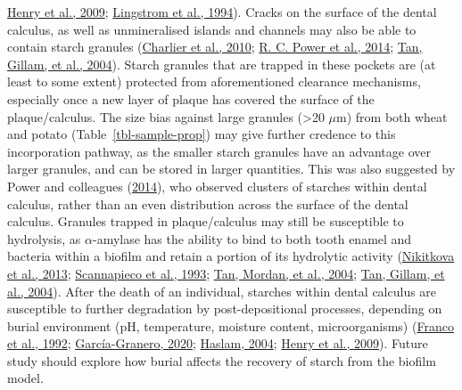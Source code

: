 \documentclass[
  b5paper,
]{book}
\begin{document}
\protect\hyperlink{ref-henryCookingStarch2009}{Henry et al., 2009};
\protect\hyperlink{ref-lingstromStarchyFood1994}{Lingstrom et al.,
1994}). Cracks on the surface of the dental calculus, as well as
unmineralised islands and channels may also be able to contain starch
granules (\protect\hyperlink{ref-charlierSEMCalculus2010}{Charlier et
al., 2010}; \protect\hyperlink{ref-powerSEMCalculus2014}{R. C. Power et
al., 2014}; \protect\hyperlink{ref-tanCalculusUltrastructure2004}{Tan,
Gillam, et al., 2004}). Starch granules that are trapped in these
pockets are (at least to some extent) protected from aforementioned
clearance mechanisms, especially once a new layer of plaque has covered
the surface of the plaque/calculus. The size bias against large granules
(\textgreater20 \(\mu\)m) from both wheat and potato
(Table~\ref{tbl-sample-prop}) may give further credence to this
incorporation pathway, as the smaller starch granules have an advantage
over larger granules, and can be stored in larger quantities. This was
also suggested by Power and colleagues
(\protect\hyperlink{ref-powerSEMCalculus2014}{2014}), who observed
clusters of starches within dental calculus, rather than an even
distribution across the surface of the dental calculus. Granules trapped
in plaque/calculus may still be susceptible to hydrolysis, as
\(\alpha\)-amylase has the ability to bind to both tooth enamel and
bacteria within a biofilm and retain a portion of its hydrolytic
activity (\protect\hyperlink{ref-nikitkovaStarchBiofilms2013}{Nikitkova
et al., 2013};
\protect\hyperlink{ref-scannapiecoSalivaryAmylase1993}{Scannapieco et
al., 1993}; \protect\hyperlink{ref-tanBacterialViability2004}{Tan,
Mordan, et al., 2004};
\protect\hyperlink{ref-tanCalculusUltrastructure2004}{Tan, Gillam, et
al., 2004}). After the death of an individual, starches within dental
calculus are susceptible to further degradation by post-depositional
processes, depending on burial environment (pH, temperature, moisture
content, microorganisms)
(\protect\hyperlink{ref-francoStarchDegradation1992}{Franco et al.,
1992};
\protect\hyperlink{ref-graneroStarchTaphonomy2020}{García-Granero,
2020}; \protect\hyperlink{ref-haslamDecompositionStarch2004}{Haslam,
2004}; \protect\hyperlink{ref-henryCookingStarch2009}{Henry et al.,
2009}). Future study should explore how burial affects the recovery of
starch from the biofilm model.
\end{document}
